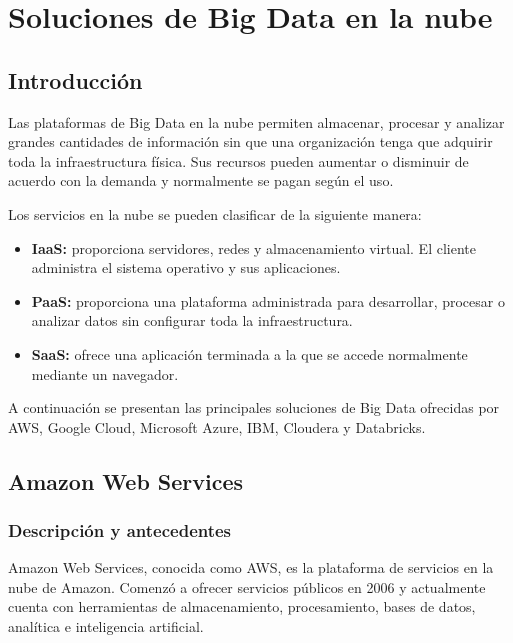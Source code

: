 
\section{Soluciones de Big Data en la nube}

\subsection{Introducción}

Las plataformas de Big Data en la nube permiten almacenar, procesar y
analizar grandes cantidades de información sin que una organización tenga
que adquirir toda la infraestructura física. Sus recursos pueden aumentar o
disminuir de acuerdo con la demanda y normalmente se pagan según el uso.

Los servicios en la nube se pueden clasificar de la siguiente manera:

\begin{itemize}
    \item \textbf{IaaS:} proporciona servidores, redes y almacenamiento virtual.
    El cliente administra el sistema operativo y sus aplicaciones.
    
    \item \textbf{PaaS:} proporciona una plataforma administrada para desarrollar,
    procesar o analizar datos sin configurar toda la infraestructura.
    
    \item \textbf{SaaS:} ofrece una aplicación terminada a la que se accede
    normalmente mediante un navegador.
\end{itemize}

A continuación se presentan las principales soluciones de Big Data ofrecidas
por AWS, Google Cloud, Microsoft Azure, IBM, Cloudera y Databricks.

\subsection{Amazon Web Services}

\subsubsection*{Descripción y antecedentes}

Amazon Web Services, conocida como AWS, es la plataforma de servicios en la
nube de Amazon. Comenzó a ofrecer servicios públicos en 2006 y actualmente
cuenta con herramientas de almacenamiento, procesamiento, bases de datos,
analítica e inteligencia artificial.

